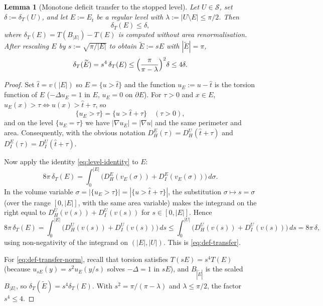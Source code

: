 \documentclass[11pt]{amsart}
\newtheorem{lemma}[theorem]{Lemma}
\newcommand{\Et}{E_{\hat t}}
\newcommand{\dT}{\delta_T}
\newcommand{\Etil}{\widetilde E}
\newcommand{\Sclass}{\mathcal S}
\begin{document}
\begin{lemma}[Monotone deficit transfer to the stopped level]
\label{lem:def-transfer}
Let \(U\in\Sclass\), set \(\delta:=\dT(U)\), and let \(E:=\Et\) be a
regular level with \(\lambda:=|U\setminus E|\le\pi/2\).  Then
\begin{equation}\label{eq:def-transfer}
   \dT(E)\le\delta,
\end{equation}
where \(\dT(E)=T(B_{|E|})-T(E)\) is computed without area
renormalisation.  After rescaling \(E\) by
\(s:=\sqrt{\pi/|E|}\) to obtain \(\Etil:=sE\) with \(|\Etil|=\pi\),
\begin{equation}\label{eq:def-transfer-norm}
   \dT(\Etil)=s^4\,\dT(E)
      \le\Bigl(\frac{\pi}{\pi-\lambda}\Bigr)^{2}\delta
      \le 4\delta.
\end{equation}
\end{lemma}

\begin{proof}
Set \(\hat t=v(|E|)\) so \(E=\{u>\hat t\}\) and the function
\(u_E:=u-\hat t\) is the torsion function of \(E\)
(\(-\Delta u_E=1\) in \(E\), \(u_E=0\) on \(\partial E\)).  For
\(\tau>0\) and \(x\in E\), \(u_E(x)>\tau\iff u(x)>\hat t+\tau\), so
\[
   \{u_E>\tau\}=\{u>\hat t+\tau\}\quad(\tau>0),
\]
and on the level \(\{u_E=\tau\}\) we have
\(|\nabla u_E|=|\nabla u|\) and the same perimeter and area.
Consequently, with the obvious notation
\(D_H^E(\tau)=D_H^U(\hat t+\tau)\) and
\(D_I^E(\tau)=D_I^U(\hat t+\tau)\).

Now apply the identity \eqref{eq:level-identity} to \(E\):
\[
   8\pi\,\dT(E)
      =\int_0^{|E|}
      \bigl(D_H^E(v_E(\sigma))+D_I^E(v_E(\sigma))\bigr)
      \,d\sigma.
\]
In the volume variable \(\sigma=|\{u_E>\tau\}|=|\{u>\hat t+\tau\}|\),
the substitution \(\sigma\mapsto s=\sigma\) (over the range
\([0,|E|]\), with the same area variable) makes the integrand on the
right equal to \(D_H^U(v(s))+D_I^U(v(s))\) for \(s\in[0,|E|]\).  Hence
\[
   8\pi\,\dT(E)
      =\int_0^{|E|}\bigl(D_H^U(v(s))+D_I^U(v(s))\bigr)\,ds
      \le\int_0^{|U|}\bigl(D_H^U(v(s))+D_I^U(v(s))\bigr)\,ds
      =8\pi\,\delta,
\]
using non-negativity of the integrand on \((|E|,|U|)\).  This is
\eqref{eq:def-transfer}.

For \eqref{eq:def-transfer-norm}, recall that torsion satisfies
\(T(sE)=s^4 T(E)\) (because \(u_{sE}(y)=s^2 u_E(y/s)\) solves
\(-\Delta=1\) in \(sE\)), and \(B_{|\Etil|}\) is the scaled
\(B_{|E|}\), so \(\dT(\Etil)=s^4\dT(E)\).  With
\(s^2=\pi/(\pi-\lambda)\) and \(\lambda\le\pi/2\), the factor
\(s^4\le 4\).
\end{proof}
\end{document}
